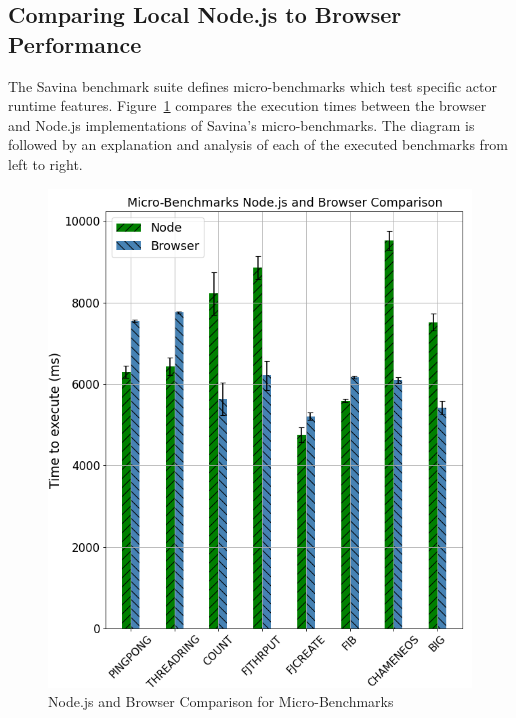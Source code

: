 \documentclass[oneside]{um-fict}
\begin{document}
\subsection{Comparing Local Node.js to Browser Performance}
The Savina benchmark suite defines micro-benchmarks which test specific actor runtime features. Figure~\ref{fig:micro} compares the execution times between the browser and Node.js implementations of Savina's micro-benchmarks. The diagram is followed by an explanation and analysis of each of the executed benchmarks from left to right.
\begin{figure}[H]
    \begin{centering}
        \includegraphics[width=\textwidth]{resources/micro.png}
        \caption{Node.js and Browser Comparison for Micro-Benchmarks}\label{fig:micro}
    \end{centering}
\end{figure}
\end{document}
